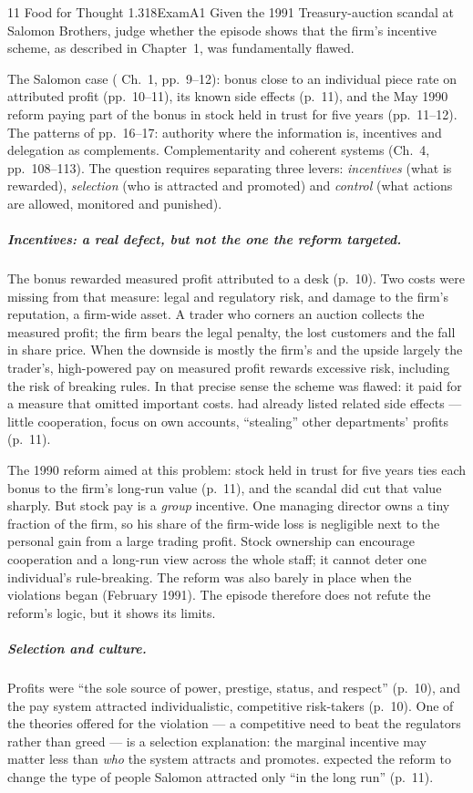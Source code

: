 \begin{exsol}{11}{\MR{} Food for Thought 1.3}{18}{Exam}{A1}
\asked Given the 1991 Treasury-auction scandal at Salomon Brothers, judge whether the episode shows
that the firm's incentive scheme, as described in Chapter~1, was fundamentally flawed.

\method The Salomon case (\MR{} Ch.~1, pp.~9--12): bonus close to an individual piece rate on
attributed profit (pp.~10--11), its known side effects (p.~11), and the May 1990 reform paying part
of the bonus in stock held in trust for five years (pp.~11--12). The patterns of pp.~16--17:
authority where the information is, incentives and delegation as complements. Complementarity and
coherent systems (Ch.~4, pp.~108--113). The question requires separating three levers:
\emph{incentives} (what is rewarded), \emph{selection} (who is attracted and promoted) and
\emph{control} (what actions are allowed, monitored and punished).

\solution
\subparagraph{Incentives: a real defect, but not the one the reform targeted.} The bonus rewarded
measured profit attributed to a desk (p.~10). Two costs were missing from that measure: legal
and regulatory risk, and damage to the firm's reputation, a firm-wide asset. A trader who corners
an auction collects the measured profit; the firm bears the legal penalty, the lost customers and
the fall in share price. When the downside is mostly the firm's and the upside largely the
trader's, high-powered pay on measured profit rewards excessive risk, including the risk of
breaking rules. In that precise sense the scheme was flawed: it paid for a measure that omitted
important costs. \MR{} had already listed related side effects --- little cooperation, focus on
own accounts, ``stealing'' other departments' profits (p.~11).

The 1990 reform aimed at this problem: stock held in trust for five years ties each bonus to the
firm's long-run value (p.~11), and the scandal did cut that value sharply. But stock pay is a
\emph{group} incentive. One managing director owns a tiny fraction of the firm, so his share of
the firm-wide loss is negligible next to the personal gain from a large trading profit. Stock
ownership can encourage cooperation and a long-run view across the whole staff; it cannot deter
one individual's rule-breaking. The reform was also barely in place when the violations began
(February 1991). The episode therefore does not refute the reform's logic, but it shows its limits.

\subparagraph{Selection and culture.} Profits were ``the sole source of power, prestige, status,
and respect'' (p.~10), and the pay system attracted individualistic, competitive risk-takers
(p.~10). One of the theories offered for the violation --- a competitive need to beat the
regulators rather than greed --- is a selection explanation: the marginal incentive may matter
less than \emph{who} the system attracts and promotes. \MR{} expected the reform to change the type
of people Salomon attracted only ``in the long run'' (p.~11).


\end{exsol}
